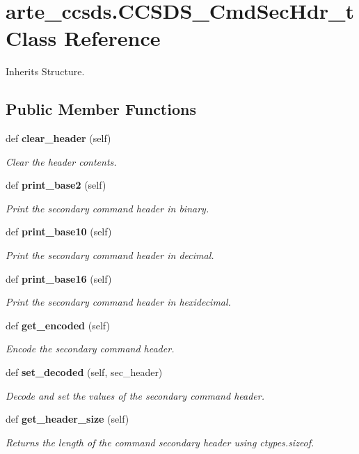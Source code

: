 \section{arte\+\_\+ccsds.\+C\+C\+S\+D\+S\+\_\+\+Cmd\+Sec\+Hdr\+\_\+t Class Reference}
\label{classarte__ccsds_1_1_c_c_s_d_s___cmd_sec_hdr__t}


Inherits Structure.

\subsection*{Public Member Functions}
\begin{DoxyCompactItemize}
\item 
def {\bf clear\+\_\+header} (self)
\begin{DoxyCompactList}\small\item\em Clear the header contents. \end{DoxyCompactList}\item 
def {\bf print\+\_\+base2} (self)
\begin{DoxyCompactList}\small\item\em Print the secondary command header in binary. \end{DoxyCompactList}\item 
def {\bf print\+\_\+base10} (self)
\begin{DoxyCompactList}\small\item\em Print the secondary command header in decimal. \end{DoxyCompactList}\item 
def {\bf print\+\_\+base16} (self)
\begin{DoxyCompactList}\small\item\em Print the secondary command header in hexidecimal. \end{DoxyCompactList}\item 
def {\bf get\+\_\+encoded} (self)
\begin{DoxyCompactList}\small\item\em Encode the secondary command header. \end{DoxyCompactList}\item 
def {\bf set\+\_\+decoded} (self, sec\+\_\+header)
\begin{DoxyCompactList}\small\item\em Decode and set the values of the secondary command header. \end{DoxyCompactList}\item 
def {\bf get\+\_\+header\+\_\+size} (self)
\begin{DoxyCompactList}\small\item\em Returns the length of the command secondary header using ctypes.\+sizeof. \end{DoxyCompactList}\end{DoxyCompactItemize}


